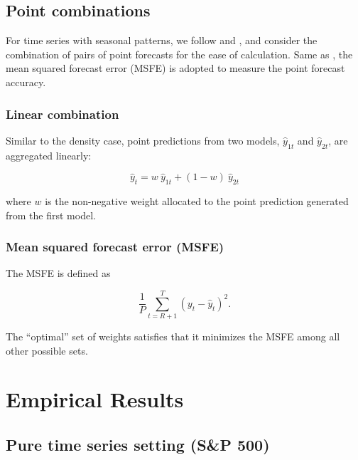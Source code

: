 \documentclass{monashthesis}
\begin{document}
\hypertarget{point-combinations}{%
\section{Point combinations}\label{point-combinations}}

For time series with seasonal patterns, we follow \textcite{BG69} and \textcite{SW09}, and consider the combination of pairs of point forecasts for the ease of calculation. Same as \textcite{SW09}, the mean squared forecast error (MSFE) is adopted to measure the point forecast accuracy.

\hypertarget{linear-combination}{%
\subsection{Linear combination}\label{linear-combination}}

Similar to the density case, point predictions from two models, \(\hat y_{1t}\) and \(\hat y_{2t}\), are aggregated linearly:

\begin{equation}
\label{eqn:PC1}
\hat y_t = w \ \hat y_{1t} + (1-w) \ \hat y_{2t}
\end{equation}

where \(w\) is the non-negative weight allocated to the point prediction generated from the first model.

\hypertarget{mean-squared-forecast-error-msfe}{%
\subsection{Mean squared forecast error (MSFE)}\label{mean-squared-forecast-error-msfe}}

The MSFE is defined as

\begin{equation}
\label{eqn:MSFE1}
\frac{1}{P} \sum^T_{t=R+1} (y_t - \hat y_t)^2.
\end{equation}

The ``optimal'' set of weights satisfies that it minimizes the MSFE among all other possible sets.

\hypertarget{empirical-results}{%
\chapter{Empirical Results}\label{empirical-results}}

\hypertarget{pure-time-series-setting-sp-500}{%
\section{Pure time series setting (S\&P 500)}\label{pure-time-series-setting-sp-500}}
\end{document}
